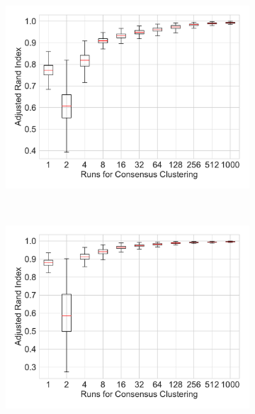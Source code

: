 \documentclass[varwidth, border=0pt]{standalone}
\begin{document}
\begin{figure}
\begin{subfigure}{0.5\linewidth}
			\includegraphics[width=\linewidth]{../../graphics/variance_impact_of_consensus_clustering_rand_us_reg}
		\end{subfigure}~%
		\begin{subfigure}{0.5\linewidth}
			\includegraphics[width=\linewidth]{../../graphics/variance_impact_of_consensus_clustering_rand_de_reg}
		\end{subfigure}
	\end{figure}
	
\end{document}

